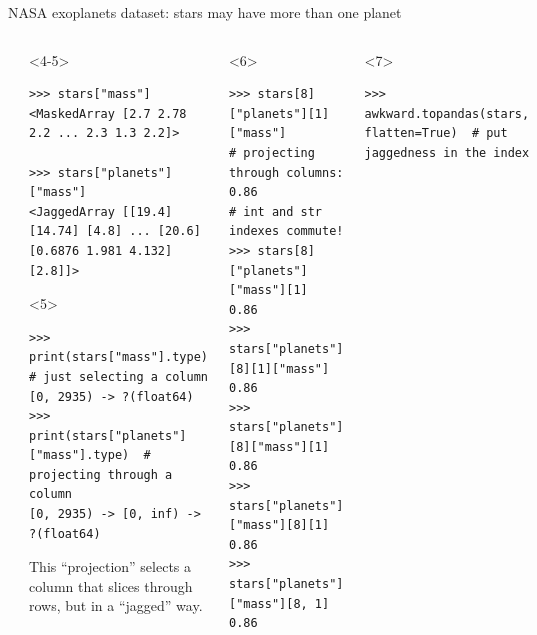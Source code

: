 \documentclass[aspectratio=169]{beamer}
\begin{document}
\begin{frame}[fragile]{NASA exoplanets dataset: stars may have more than one planet}
\begin{columns}
\begin{onlyenv}
\vspace{10 cm}
\end{onlyenv}
\begin{onlyenv}<4-5>
\begin{verbatim}
>>> stars["mass"]
<MaskedArray [2.7 2.78 2.2 ... 2.3 1.3 2.2]>

>>> stars["planets"]["mass"]
<JaggedArray [[19.4] [14.74] [4.8] ... [20.6] [0.6876 1.981 4.132] [2.8]]>
\end{verbatim}

\begin{uncoverenv}<5>
\begin{verbatim}
>>> print(stars["mass"].type)             # just selecting a column
[0, 2935) -> ?(float64)
>>> print(stars["planets"]["mass"].type)  # projecting through a column
[0, 2935) -> [0, inf) -> ?(float64)
\end{verbatim}

\begin{center}
This ``projection'' selects a column that slices through rows, but in a ``jagged'' way.
\end{center}
\end{uncoverenv}

\vspace{10 cm}
\end{onlyenv}
\begin{onlyenv}<6>
\begin{verbatim}
>>> stars[8]["planets"][1]["mass"]        # projecting through columns:
0.86                                      # int and str indexes commute!
>>> stars[8]["planets"]["mass"][1]
0.86
>>> stars["planets"][8][1]["mass"]
0.86
>>> stars["planets"][8]["mass"][1]
0.86
>>> stars["planets"]["mass"][8][1]
0.86
>>> stars["planets"]["mass"][8, 1]
0.86
\end{verbatim}

\vspace{10 cm}
\end{onlyenv}
\begin{onlyenv}<7>
\vspace{-0.4 cm}
\begin{verbatim}
>>> awkward.topandas(stars, flatten=True)  # put jaggedness in the index
\end{verbatim}


\end{onlyenv}
\end{columns}
\end{frame}
\end{document}
